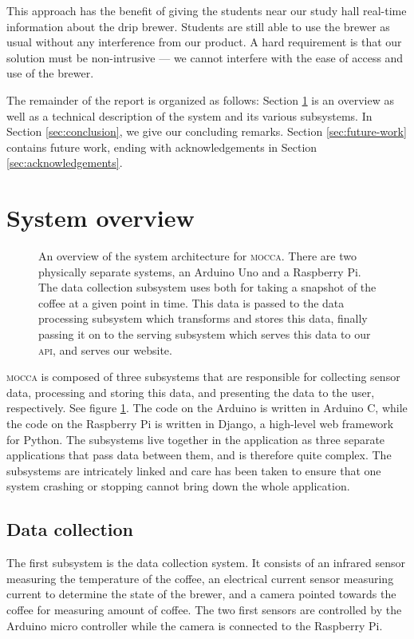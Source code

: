 \documentclass[12pt,a4paper,oneside,article]{memoir}
\numberwithin{equation}{chapter}
\begin{document}
This approach has the benefit of giving the students near our study hall
real-time information about the drip brewer. Students are still able to use the
brewer as usual without any interference from our product. A hard requirement is
that our solution must be non-intrusive --- we cannot interfere with the ease of
access and use of the brewer.

The remainder of the report is organized as follows: Section
\ref{sec:system-overview} is an overview as well as a technical description of
the system and its various subsystems. In Section \ref{sec:conclusion}, we give
our concluding remarks. Section \ref{sec:future-work} contains future work,
ending with acknowledgements in Section \ref{sec:acknowledgements}.

\section{System overview}\label{sec:system-overview}
\begin{figure}[h]
  \centerfloat{}
  \scalebox{.75}{}
  \caption{An overview of the system architecture for \textsc{mocca}. There are
    two physically separate systems, an Arduino Uno and a Raspberry Pi. The data
    collection subsystem uses both for taking a snapshot of the coffee at a
    given point in time. This data is passed to the data processing subsystem
    which transforms and stores this data, finally passing it on to the serving
    subsystem which serves this data to our \textsc{api}, and serves our
    website.}\label{fig:architecture}
\end{figure}
\textsc{mocca} is composed of three subsystems that are responsible for
collecting sensor data, processing and storing this data, and presenting the
data to the user, respectively. See figure \ref{fig:architecture}. The code on
the Arduino is written in Arduino C, while the code on the Raspberry Pi is
written in Django, a high-level web framework for Python. The subsystems live
together in the application as three separate applications that pass data
between them, and is therefore quite complex. The subsystems are intricately
linked and care has been taken to ensure that one system crashing or stopping
cannot bring down the whole application.

\subsection{Data collection}\label{sec:data-collection}
The first subsystem is the data collection system. It consists of an infrared
sensor measuring the temperature of the coffee, an electrical current sensor
measuring current to determine the state of the brewer, and a camera pointed
towards the coffee for measuring amount of coffee. The two first sensors are
controlled by the Arduino micro controller while the camera is connected to the
Raspberry Pi.
\end{document}
